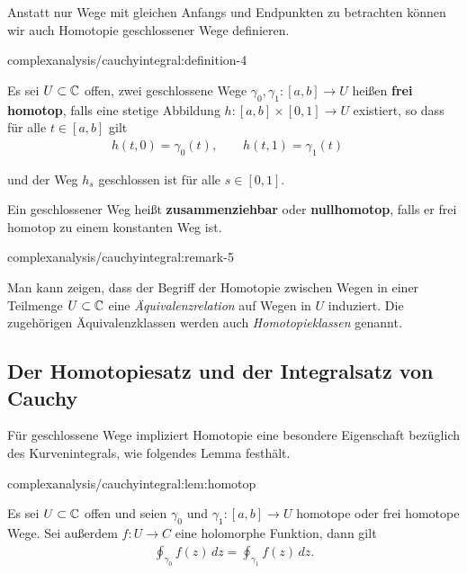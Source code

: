 \par
Anstatt nur Wege mit gleichen Anfangs und Endpunkten zu betrachten können wir auch Homotopie geschlossener Wege definieren.
\begin{definition}{}{complexanalysis/cauchyintegral:definition-4}



\par
Es sei \(U\subset\mathbb{C}\) offen, zwei geschlossene Wege \(\gamma_0, \gamma_1:[a,b]\to U\) heißen \textbf{frei homotop}, falls eine stetige Abbildung \(h:[a,b]\times[0,1]\to U\) existiert, so dass für alle \(t\in[a,b]\) gilt
\begin{align*}
h(t,0) = \gamma_0(t), \qquad h(t,1) = \gamma_1(t)\quad
\end{align*}
\par
und der Weg \(h_s\) geschlossen ist für alle \(s\in [0,1]\).

\par
Ein geschlossener Weg heißt \textbf{zusammenziehbar} oder \textbf{nullhomotop}, falls er frei homotop zu einem konstanten Weg ist.
\end{definition}
\begin{remark}{}{complexanalysis/cauchyintegral:remark-5}



\par
Man kann zeigen, dass der Begriff der Homotopie zwischen Wegen in einer Teilmenge \(U \subset \mathbb{C}\) eine \emph{Äquivalenzrelation} auf Wegen in \(U\) induziert. Die zugehörigen Äquivalenzklassen werden auch \emph{Homotopieklassen} genannt.
\end{remark}


\subsection{Der Homotopiesatz und der Integralsatz von Cauchy}
\label{\detokenize{complexanalysis/cauchyintegral:der-homotopiesatz-und-der-integralsatz-von-cauchy}}
\par
Für geschlossene Wege impliziert Homotopie eine besondere Eigenschaft bezüglich des Kurvenintegrals, wie folgendes Lemma festhält.
\begin{lemma}{}{complexanalysis/cauchyintegral:lem:homotop}



\par
Es sei \(U \subset \mathbb{C}\) offen und seien \(\gamma_0\) und \(\gamma_1:[a,b]\to U\) homotope oder frei homotope Wege.
Sei außerdem \(f:U\to C\) eine holomorphe Funktion, dann gilt
\begin{align*}
\oint_{\gamma_0} f(z) \, dz = \oint_{\gamma_1} f(z) \, dz.
\end{align*}\end{lemma}

